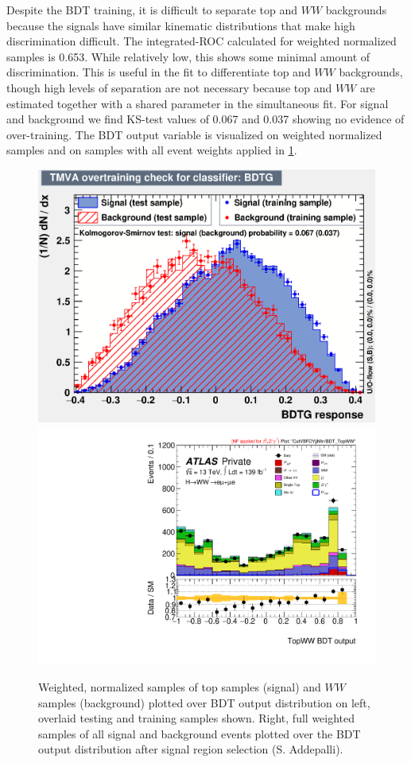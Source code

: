 Despite the BDT training, it is difficult to separate top and $WW$ backgrounds because the signals have similar kinematic distributions that make high discrimination difficult. The integrated-ROC calculated for weighted normalized samples is 0.653. While relatively low, this shows some minimal amount of discrimination. This is useful in the fit to differentiate top and $WW$ backgrounds, though high levels of separation are not necessary because top and $WW$ are estimated together with a shared parameter in the simultaneous fit. For signal and background we find KS-test values of 0.067 and 0.037 showing no evidence of over-training. The BDT output variable is visualized on weighted normalized samples and on samples with all event weights applied in \ref{fig:WWBDTresult}. 

\begin{figure}[!htbp]
\centering
  \includegraphics[width=.45\linewidth]{Pictures/TopvsWW/overtrain_BDTG.eps}
  \includegraphics[width=.35\linewidth]{Pictures/run2-emme-CutVBFDYjjMin-BDT_TopWW-lin.pdf}
\caption{Weighted, normalized samples of top samples (signal) and $WW$ samples (background) plotted over BDT output distribution on left, overlaid testing and training samples shown. Right, full weighted samples of all signal and background events plotted over the BDT output distribution after signal region selection (S. Addepalli).}
\label{fig:WWBDTresult}
\end{figure}

